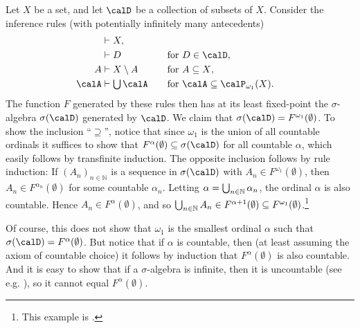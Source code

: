 \documentclass[a4paper, 11pt, article, danish, oneside]{memoir}
\newcommand{\naturals}{\mathbb{N}}
\DeclarePairedDelimiter{\auxdelimparen}{(}{)}
\newcommand{\powersetcard}[3][]{\calP_{#2}\auxdelimparen[#1]{#3}}
\newcommand{\powersetcount}[2][]{\powersetcard[#1]{\omega_1}{#2}}
\DeclareMathOperator*{\smallbigcup}{\textstyle\bigcup}
\DeclareMathOperator*{\bigunion}{\mathchoice
    {\smallbigcup}%
    {\bigcup}%
    {\bigcup}%
    {\bigcup}%
}
\begin{document}
\begin{examplebreak}
    Let $X$ be a set, and let $\calD$ be a collection of subsets of $X$. Consider the inference rules (with potentially infinitely many antecedents)
    \begin{alignat*}{2}
        \myinfruleAlign{}{}{X}, \\
        \myinfruleAlign{}{}{D} && \quad \text{for $D \in \calD$}, \\
        \myinfruleAlign{}{A}{X \setminus A} && \quad \text{for $A \subseteq X$}, \\
        \myinfruleAlign{}{\calA}{\bigunion \calA} && \quad \text{for $\calA \subseteq \powersetcount{X}$}.
    \end{alignat*}
    The function $F$ generated by these rules then has at its least fixed-point the $\sigma$-algebra $\sigma(\calD)$ generated by $\calD$. We claim that $\sigma(\calD) = F^{\omega_1}(\emptyset)$. To show the inclusion \enquote{$\supseteq$}, notice that since $\omega_1$ is the union of all countable ordinals it suffices to show that $F^\alpha(\emptyset) \subseteq \sigma(\calD)$ for all countable $\alpha$, which easily follows by transfinite induction. The opposite inclusion follows by rule induction: If $(A_n)_{n \in \naturals}$ is a sequence in $\sigma(\calD)$ with $A_n \in F^{\omega_1}(\emptyset)$, then $A_n \in F^{\alpha_n}(\emptyset)$ for some countable $\alpha_n$. Letting $\alpha = \bigunion_{n \in \naturals} \alpha_n$, the ordinal $\alpha$ is also countable. Hence $A_n \in F^\alpha(\emptyset)$, and so $\bigunion_{n \in \naturals} A_n \in F^{\alpha+1}(\emptyset) \subseteq F^{\omega_1}(\emptyset)$.\footnote{This example is \textcite[Proposition~1.23]{folland-real-analysis}.}

    Of course, this does not show that $\omega_1$ is the smallest ordinal $\alpha$ such that $\sigma(\calD) = F^\alpha(\emptyset)$. But notice that if $\alpha$ is countable, then (at least assuming the axiom of countable choice) it follows by induction that $F^\alpha(\emptyset)$ is also countable. And it is easy to show that if a $\sigma$-algebra is infinite, then it is uncountable (see e.g. \cite[Exercise~1.3]{folland-real-analysis}), so it cannot equal $F^\alpha(\emptyset)$.
\end{examplebreak}
\end{document}
